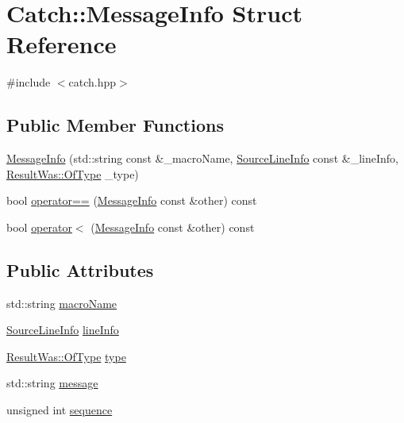 \hypertarget{structCatch_1_1MessageInfo}{\section{Catch\-:\-:Message\-Info Struct Reference}
\label{structCatch_1_1MessageInfo}
}


{\ttfamily \#include $<$catch.\-hpp$>$}

\subsection*{Public Member Functions}
\begin{DoxyCompactItemize}
\item 
\hyperlink{structCatch_1_1MessageInfo_a2e336c33ebef7af3c1bbae6a56e14f8a}{Message\-Info} (std\-::string const \&\-\_\-macro\-Name, \hyperlink{structCatch_1_1SourceLineInfo}{Source\-Line\-Info} const \&\-\_\-line\-Info, \hyperlink{structCatch_1_1ResultWas_a624e1ee3661fcf6094ceef1f654601ef}{Result\-Was\-::\-Of\-Type} \-\_\-type)
\item 
bool \hyperlink{structCatch_1_1MessageInfo_a30fe117138e568c5a9dfdabb7de6e790}{operator==} (\hyperlink{structCatch_1_1MessageInfo}{Message\-Info} const \&other) const 
\item 
bool \hyperlink{structCatch_1_1MessageInfo_a7a2b1ec3772cd35176e2ee25a94be16a}{operator$<$} (\hyperlink{structCatch_1_1MessageInfo}{Message\-Info} const \&other) const 
\end{DoxyCompactItemize}
\subsection*{Public Attributes}
\begin{DoxyCompactItemize}
\item 
std\-::string \hyperlink{structCatch_1_1MessageInfo_a156ade4b3cc731f6ec7b542ae47ba8e3}{macro\-Name}
\item 
\hyperlink{structCatch_1_1SourceLineInfo}{Source\-Line\-Info} \hyperlink{structCatch_1_1MessageInfo_a985165328723e599696ebd8e43195cc5}{line\-Info}
\item 
\hyperlink{structCatch_1_1ResultWas_a624e1ee3661fcf6094ceef1f654601ef}{Result\-Was\-::\-Of\-Type} \hyperlink{structCatch_1_1MessageInfo_ae928b9117465c696e45951d9d0284e78}{type}
\item 
std\-::string \hyperlink{structCatch_1_1MessageInfo_ab6cd06e050bf426c6577502a5c50e256}{message}
\item 
unsigned int \hyperlink{structCatch_1_1MessageInfo_a7f4f57ea21e50160adefce7b68a781d6}{sequence}
\end{DoxyCompactItemize}


